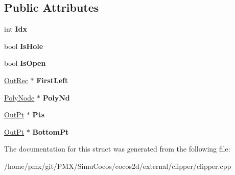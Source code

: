 \subsection*{Public Attributes}
\begin{DoxyCompactItemize}
\item 
\mbox{\label{structClipperLib_1_1OutRec_ae2c437dec114034a456a7238ab6d8055}} 
int {\bfseries Idx}
\item 
\mbox{\label{structClipperLib_1_1OutRec_a18b2b534b717139528047ba10a1c805c}} 
bool {\bfseries Is\+Hole}
\item 
\mbox{\label{structClipperLib_1_1OutRec_a065731c084453a818939c219868a2fcc}} 
bool {\bfseries Is\+Open}
\item 
\mbox{\label{structClipperLib_1_1OutRec_a51d140b6beb0de0afb5845e28ede64fd}} 
\hyperlink{structClipperLib_1_1OutRec}{Out\+Rec} $\ast$ {\bfseries First\+Left}
\item 
\mbox{\label{structClipperLib_1_1OutRec_a201c9ad4da62c3615677504ad4cbdb76}} 
\hyperlink{classClipperLib_1_1PolyNode}{Poly\+Node} $\ast$ {\bfseries Poly\+Nd}
\item 
\mbox{\label{structClipperLib_1_1OutRec_a354f3f0ad24f0a62550776f95356b872}} 
\hyperlink{structClipperLib_1_1OutPt}{Out\+Pt} $\ast$ {\bfseries Pts}
\item 
\mbox{\label{structClipperLib_1_1OutRec_a20a04745403590ef01068623a2aeb10c}} 
\hyperlink{structClipperLib_1_1OutPt}{Out\+Pt} $\ast$ {\bfseries Bottom\+Pt}
\end{DoxyCompactItemize}


The documentation for this struct was generated from the following file\+:\begin{DoxyCompactItemize}
\item 
/home/pmx/git/\+P\+M\+X/\+Simu\+Cocos/cocos2d/external/clipper/clipper.\+cpp\end{DoxyCompactItemize}
